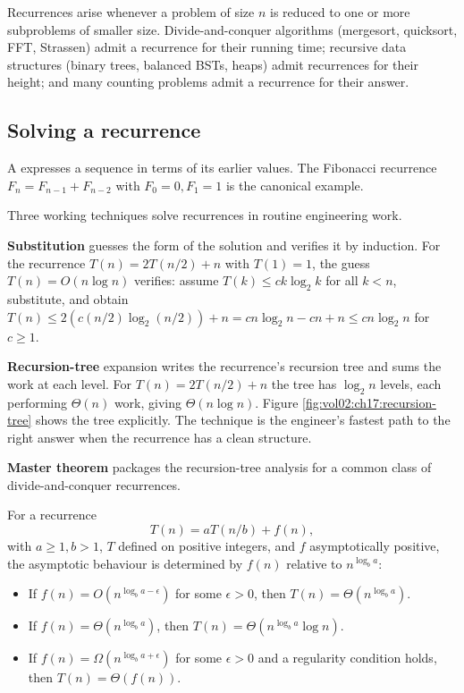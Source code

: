 Recurrences arise whenever a problem of size $n$ is reduced to one
or more subproblems of smaller size. Divide-and-conquer algorithms
(mergesort, quicksort, FFT, Strassen) admit a recurrence for their
running time; recursive data structures (binary trees, balanced
BSTs, heaps) admit recurrences for their height; and many counting
problems admit a recurrence for their answer.

\subsection{Solving a recurrence}

A  expresses a sequence in terms of
its earlier values. The Fibonacci recurrence $F_{n} = F_{n-1} +
F_{n-2}$ with $F_{0} = 0, F_{1} = 1$ is the canonical example.

Three working techniques solve recurrences in routine engineering
work.

\textbf{Substitution} guesses the form of the solution and verifies
it by induction. For the recurrence $T(n) = 2 T(n/2) + n$ with
$T(1) = 1$, the guess $T(n) = O(n \log n)$ verifies: assume $T(k)
\leq c k \log_{2} k$ for all $k < n$, substitute, and obtain
$T(n) \leq 2 (c (n/2) \log_{2}(n/2)) + n = c n \log_{2} n - c n + n
\leq c n \log_{2} n$ for $c \geq 1$.

\textbf{Recursion-tree} expansion writes the recurrence's recursion
tree and sums the work at each level. For $T(n) = 2 T(n/2) + n$ the
tree has $\log_{2} n$ levels, each performing $\Theta(n)$ work,
giving $\Theta(n \log n)$. Figure \ref{fig:vol02:ch17:recursion-tree}
shows the tree explicitly. The technique is the engineer's fastest
path to the right answer when the recurrence has a clean structure.



\textbf{Master theorem} packages the recursion-tree analysis for a
common class of divide-and-conquer recurrences.

\begin{principle}
For a recurrence
\[
T(n) = a T(n/b) + f(n),
\]
with $a \geq 1, b > 1$, $T$ defined on positive integers, and $f$
asymptotically positive, the asymptotic behaviour is determined by
$f(n)$ relative to $n^{\log_{b} a}$:
\begin{itemize}[leftmargin=*]
  \item If $f(n) = O(n^{\log_{b} a - \epsilon})$ for some $\epsilon
    > 0$, then $T(n) = \Theta(n^{\log_{b} a})$.
  \item If $f(n) = \Theta(n^{\log_{b} a})$, then $T(n) =
    \Theta(n^{\log_{b} a} \log n)$.
  \item If $f(n) = \Omega(n^{\log_{b} a + \epsilon})$ for some
    $\epsilon > 0$ and a regularity condition holds, then $T(n) =
    \Theta(f(n))$.
\end{itemize}
\end{principle}

